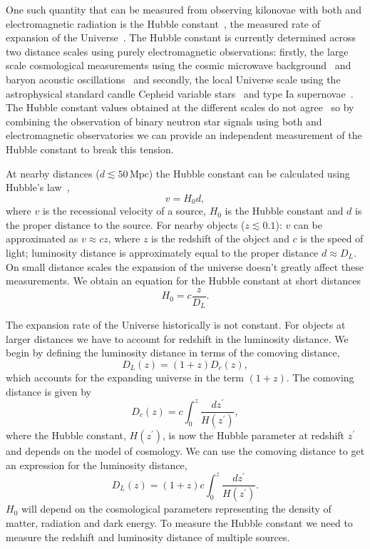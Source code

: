 One such quantity that can be measured from observing kilonovae with both \gws and electromagnetic radiation is the Hubble constant~\cite{Schutz:1986}, the measured rate of expansion of the Universe~\cite{hubble:1929}. The Hubble constant is currently determined across two distance scales using purely electromagnetic observations: firstly, the large scale cosmological measurements using the cosmic microwave background~\cite{WMAP_H0:2003} and baryon acoustic oscillations~\cite{BAO_H0:2009} and secondly, the local Universe scale using the astrophysical standard candle Cepheid variable stars~\cite{Cepheids_H0:2001} and type Ia supernovae~\cite{TypeIa_H0:1998}. The Hubble constant values obtained at the different scales do not agree~\cite{H0_tension:2020} so by combining the observation of binary neutron star signals using both \gw and electromagnetic observatories we can provide an independent measurement of the Hubble constant to break this tension.

At nearby distances ($d \lesssim 50 \, \text{Mpc}$) the Hubble constant can be calculated using Hubble's law~\cite{hubble:1929},
%
\begin{equation}
    v = H_{0} d,
    \label{6:eq:basic_hubbles_law}
\end{equation}
%
where $v$ is the recessional velocity of a source, $H_{0}$ is the Hubble constant and $d$ is the proper distance to the source. For nearby objects ($z \lesssim 0.1$): $v$ can be approximated as $v \approx cz$, where $z$ is the redshift of the object and $c$ is the speed of light; luminosity distance is approximately equal to the proper distance $d \approx D_{L}$. On small distance scales the expansion of the universe doesn't greatly affect these measurements. We obtain an equation for the Hubble constant at short distances
%
\begin{equation}
    H_{0} = c \frac{z}{D_{L}}.
    \label{6:eq:hubbles-law}
\end{equation}
%

The expansion rate of the Universe historically is not constant. For objects at larger distances we have to account for redshift in the luminosity distance. We begin by defining the luminosity distance in terms of the comoving distance,
%
\begin{equation}
    D_{L}(z) = (1 + z)D_{c}(z),
\end{equation}
%
which accounts for the expanding universe in the term $(1 + z)$. The comoving distance is given by
%
\begin{equation}
    D_{c}(z) = c \int^{z}_{0} \frac{dz^{\prime}}{H(z^{\prime})},
\end{equation}
%
where the Hubble constant, $H(z^{\prime})$, is now the Hubble parameter at redshift $z^{\prime}$ and depends on the model of cosmology.
We can use the comoving distance to get an expression for the luminosity distance,
%
\begin{equation}
    D_{L}(z) = (1 + z) c \int^{z}_{0} \frac{dz^{\prime}}{H(z^{\prime})}.
\end{equation}
%
$H_{0}$ will depend on the cosmological parameters representing the density of matter, radiation and dark energy. To measure the Hubble constant we need to measure the redshift and luminosity distance of multiple sources.

